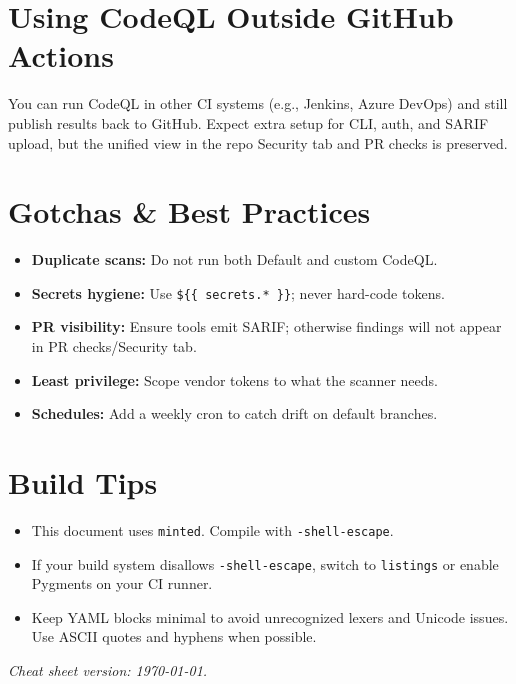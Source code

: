 \documentclass[11pt]{article}
\begin{document}
\section*{Using CodeQL Outside GitHub Actions}
You can run CodeQL in other CI systems (e.g., Jenkins, Azure DevOps) and still publish results back to GitHub. Expect extra setup for CLI, auth, and SARIF upload, but the unified view in the repo Security tab and PR checks is preserved.

\section*{Gotchas \& Best Practices}
\begin{tcolorbox}[title=Checklist, colframe=BurntOrange]
\begin{itemize}
  \item \textbf{Duplicate scans:} Do not run both Default and custom CodeQL.
  \item \textbf{Secrets hygiene:} Use \texttt{\$\{\{ secrets.* \}\}}; never hard-code tokens.
  \item \textbf{PR visibility:} Ensure tools emit SARIF; otherwise findings will not appear in PR checks/Security tab.
  \item \textbf{Least privilege:} Scope vendor tokens to what the scanner needs.
  \item \textbf{Schedules:} Add a weekly cron to catch drift on default branches.
\end{itemize}
\end{tcolorbox}

\section*{Build Tips}
\begin{itemize}
  \item This document uses \texttt{minted}. Compile with \texttt{-shell-escape}.
  \item If your build system disallows \texttt{-shell-escape}, switch to \texttt{listings} or enable Pygments on your CI runner.
  \item Keep YAML blocks minimal to avoid unrecognized lexers and Unicode issues. Use ASCII quotes and hyphens when possible.
\end{itemize}

\vfill
\begin{center}
\small\textit{Cheat sheet version: \today{}.}
\end{center}
\end{document}
